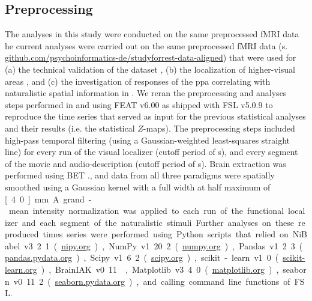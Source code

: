 \subsection{Preprocessing}

The analyses in this study were conducted on the same preprocessed fMRI data he
current analyses were carried out on the same preprocessed fMRI data (s.
\href{https://github.com/psychoinformatics-de/studyforrest-data-aligned
}{\url{github.com/psychoinformatics-de/studyforrest-data-aligned}}) that were
used for
%
(a) the technical validation of the dataset \citep{hanke2016simultaneous},
%
(b) the localization of higher-visual areas \citep{sengupta2016extension}, and
%
(c) the investigation of responses of the \ac{ppa} correlating with naturalistic
spatial information in \citep{haeusler2022processing}.
%
We reran the preprocessing and analyses steps performed in
\citet{sengupta2016extension} and \citet{haeusler2022processing} using FEAT
v6.00 \citep[FMRI Expert Analysis Tool;][]{woolrich2001autocorr} as shipped with
FSL v5.0.9 \citep[\href{https://www.fmrib.ox.ac.uk/fsl}{FMRIB's Software
Library;}][]{smith2004fsl} to reproduce the time series that served as input for
the previous statistical analyses and their results (i.e. the statistical
$Z$-maps).
The preprocessing steps included high-pass temporal filtering (using a
Gaussian-weighted least-squares straight line) for every run of the visual
localizer (cutoff period of \unit[100]{s}), and every segment of the movie and
audio-description (cutoff period of \unit[150]{s}).
Brain extraction was performed using BET \citep{smith2002bet}., and data from
all three paradigms were spatially smoothed using a Gaussian kernel with a full
width at half maximum of \unit[4.0]{mm}.
A grand-mean intensity normalization was applied to each run of the functional
localizer and each segment of the naturalistic stimuli.
%
Further analyses on these reproduced times series were performed using Python
scripts that relied on
%
NiBabel v3.2.1 (\href{https://nipy.org}{\url{nipy.org}}),
%
NumPy v1.20.2 (\href{https://numpy.org}{\url{numpy.org}}),
%
Pandas v1.2.3 (\href{https://pandas.pydata.org}{\url{pandas.pydata.org}}),
%
Scipy v1.6.2 (\href{https://scipy.org}{\url{scipy.org}}),
%
scikit-learn v1.0 (\href{https://scikit-learn.org}{\url{scikit-learn.org}}),
%
BrainIAK v0.11
\citep[\href{https://brainiak.org}{\url{brainiak.org}}][]{kumar2020brainiak,
kumar2020brainiaktutorial},
%
Matplotlib v3.4.0 (\href{https://matplotlib.org}{\url{matplotlib.org}}),
%
seaborn v0.11.2 (\href{https://seaborn.pydata.org}{\url{seaborn.pydata.org}}),
%
and calling command line functions of FSL.

